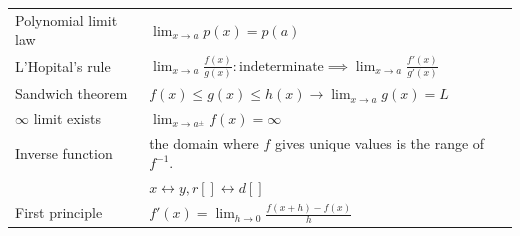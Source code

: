 \begin{landscape}
\begin{multicols*}{2}
\begin{tabularx}{\columnwidth}{@{}lX@{}}
            Polynomial limit law                & $\lim_{x\to a}p(x) = p(a)$                                                                                                                                                                                                                                                                                             \\
            L'Hopital's rule                    & $\lim_{x\to a}\frac{f(x)}{g(x)}:\text{indeterminate}\implies\lim_{x\to a}\frac{f'(x)}{g'(x)}$                                                                                                                                                                                                                          \\
            Sandwich theorem                    & $f(x)\leq g(x)\leq h(x)\to\lim_{x\to a}g(x)=L$                                                                                                                                                                                                                                                                         \\
            $\infty$ limit exists               & $\lim_{x\to a^\pm}f(x)=\infty$                                                                                                                                                                                                                                                                                         \\
            Inverse function                    & the domain where $f$ gives unique values is the range of $f^{-1}$.                                                                                                                                                                                                                                                     \\
                                                & $x\leftrightarrow y, r[]\leftrightarrow d[]$                                                                                                                                                                                                                                                                           \\
            First principle                     & $f'(x)=\lim_{h\to0}\frac{f(x+h)-f(x)}{h}$                                                                                                                                                                                                                                                                              \\

\end{tabularx}
\end{multicols*}
\end{landscape}

